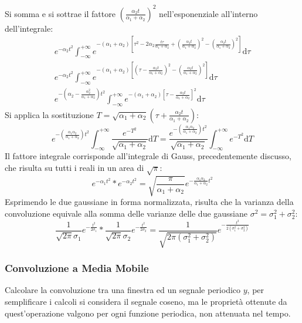 \documentclass{article}
\newcommand{\df}{\mathrm{d}}
\numberwithin{equation}{subsection}
\begin{document}
Si somma e si sottrae il fattore $\displaystyle\left(\frac{\alpha_2t}{\alpha_1+\alpha_2}\right)^2$ nell'esponenziale all'interno dell'integrale:
\begin{gather*}
    \displaystyle e^{-\alpha_2 t^2}\int_{-\infty}^{+\infty}e^{-(\alpha_1+\alpha_2)\left[\tau^2-2\alpha_2\frac{t\tau}{\alpha_1+\alpha_2}+\left(\frac{\alpha_2t}{\alpha_1+\alpha_2}\right)^2-\left(\frac{\alpha_2t}{\alpha_1+\alpha_2}\right)^2\right]}\df\tau\\
    \displaystyle e^{-\alpha_2 t^2}\int_{-\infty}^{+\infty}e^{-(\alpha_1+\alpha_2)\left[\left(\tau-\frac{\alpha_2t}{\alpha_1+\alpha_2}\right)^2-\left(\frac{\alpha_2t}{\alpha_1+\alpha_2}\right)^2\right]}\df\tau\\
    \displaystyle e^{-\left(\alpha_2-\frac{\alpha_2^2}{\alpha_1+\alpha_2}\right)t^2}\int_{-\infty}^{+\infty}e^{-(\alpha_1+\alpha_2)\left[\tau-\frac{\alpha_2t}{\alpha_1+\alpha_2}\right]^2}\df\tau
\end{gather*}
Si applica la sostituzione $T=\displaystyle\sqrt{\alpha_1+\alpha_2}\left(\tau+\frac{\alpha_2t}{\alpha_1+\alpha_2}\right)$:
\begin{equation*}
    \displaystyle e^{-\left(\frac{\alpha_1\alpha_2}{\alpha_1+\alpha_2}\right)t^2}\int_{-\infty}^{+\infty}\frac{e^{-T^2}}{\sqrt{\alpha_1+\alpha_2}}\df T=\frac{e^{-\left(\frac{\alpha_1\alpha_2}{\alpha_1+\alpha_2}\right)t^2}}{\sqrt{\alpha_1+\alpha_2}}\int_{-\infty}^{+\infty}{e^{-T^2}}\df T
\end{equation*}
Il fattore integrale corrisponde all'integrale di Gauss, precedentemente discusso, che risulta su tutti i reali in un area di $\sqrt\pi$:
\begin{equation*}
    e^{-\alpha_1t^2}*e^{-\alpha_2t^2}=\displaystyle\sqrt{\frac{\pi}{\alpha_1+\alpha_2}}e^{-\frac{\alpha_1\alpha_2}{\alpha_1+\alpha_2}t^2}
\end{equation*}
Esprimendo le due gaussiane in forma normalizzata, risulta che la varianza della convoluzione equivale alla somma delle varianze delle due gaussiane $\sigma^2=\sigma_1^2+\sigma_2^2$:
\begin{equation}
    \displaystyle\frac{1}{\sqrt{2\pi}\sigma_1}e^{-\frac{t^2}{2\sigma_1}}*\frac{1}{\sqrt{2\pi}\sigma_2}e^{-\frac{t^2}{2\sigma_2}}=\frac{1}{\sqrt{2\pi(\sigma_1^2+\sigma_2^2)}}e^{-\frac{t^2}{2(\sigma_1^2+\sigma_2^2)}}
\end{equation}

\subsubsection{Convoluzione a Media Mobile}
Calcolare la convoluzione tra una finestra ed un segnale periodico $y$, 
per semplificare i calcoli si considera il segnale coseno, ma le proprietà ottenute da quest'operazione valgono per ogni funzione periodica, non attenuata nel tempo. 
\end{document}

